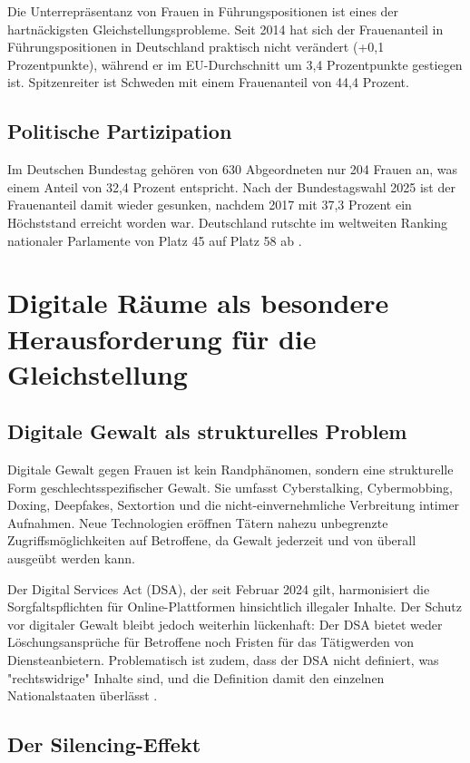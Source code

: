 \documentclass[12pt,a4paper]{article}
\begin{document}
	Die Unterrepräsentanz von Frauen in Führungspositionen ist eines der hartnäckigsten Gleichstellungsprobleme. Seit 2014 hat sich der Frauenanteil in Führungspositionen in Deutschland praktisch nicht verändert (+0,1 Prozentpunkte), während er im EU-Durchschnitt um 3,4 Prozentpunkte gestiegen ist. Spitzenreiter ist Schweden mit einem Frauenanteil von 44,4 Prozent.
	
	\subsection{Politische Partizipation}
	
	Im Deutschen Bundestag gehören von 630 Abgeordneten nur 204 Frauen an, was einem Anteil von 32,4 Prozent entspricht. Nach der Bundestagswahl 2025 ist der Frauenanteil damit wieder gesunken, nachdem 2017 mit 37,3 Prozent ein Höchststand erreicht worden war. Deutschland rutschte im weltweiten Ranking nationaler Parlamente von Platz 45 auf Platz 58 ab \cite{frauenanteil_bundestag}.
	
	\section{Digitale Räume als besondere Herausforderung für die Gleichstellung}
	
	\subsection{Digitale Gewalt als strukturelles Problem}
	
	Digitale Gewalt gegen Frauen ist kein Randphänomen, sondern eine strukturelle Form geschlechtsspezifischer Gewalt. Sie umfasst Cyberstalking, Cybermobbing, Doxing, Deepfakes, Sextortion und die nicht-einvernehmliche Verbreitung intimer Aufnahmen. Neue Technologien eröffnen Tätern nahezu unbegrenzte Zugriffsmöglichkeiten auf Betroffene, da Gewalt jederzeit und von überall ausgeübt werden kann.
	
	Der Digital Services Act (DSA), der seit Februar 2024 gilt, harmonisiert die Sorgfaltspflichten für Online-Plattformen hinsichtlich illegaler Inhalte. Der Schutz vor digitaler Gewalt bleibt jedoch weiterhin lückenhaft: Der DSA bietet weder Löschungsansprüche für Betroffene noch Fristen für das Tätigwerden von Diensteanbietern. Problematisch ist zudem, dass der DSA nicht definiert, was "rechtswidrige" Inhalte sind, und die Definition damit den einzelnen Nationalstaaten überlässt \cite{dsa_luecken}.
	
	\subsection{Der Silencing-Effekt}
	
\end{document}
